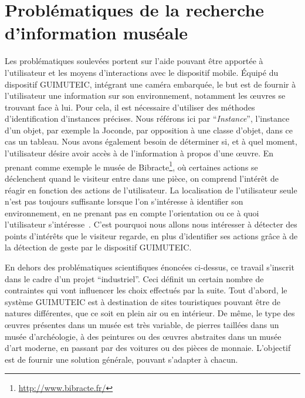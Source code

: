 \section{Problématiques de la recherche d'information muséale}
\label{sec:introcontraintes}
Les problématiques soulevées portent sur l'aide pouvant être apportée à l'utilisateur et les moyens d'interactions avec le dispositif mobile.
Équipé du dispositif GUIMUTEIC, intégrant une caméra embarquée, le but est de fournir à l'utilisateur une information sur son environnement, notamment les œuvres se trouvant face à lui.
Pour cela, il est nécessaire d'utiliser des méthodes d'identification d'instances précises.
Nous référons ici par ``{\it Instance}'', l'instance d'un objet, par exemple la Joconde, par opposition à une classe d'objet, dans ce cas un tableau.
Nous avons également besoin de déterminer si, et à quel moment, l'utilisateur désire avoir accès à de l'information à propos d’une œuvre.
En prenant comme exemple le musée de Bibracte\footnote{\url{http://www.bibracte.fr/}}, où certaines actions se déclenchent quand le visiteur entre dans une pièce, on comprend l'intérêt de réagir en fonction des actions de l'utilisateur.
La localisation de l’utilisateur seule n’est pas toujours suffisante lorsque l’on s’intéresse à identifier son environnement, en ne prenant pas en compte l’orientation ou ce à quoi l’utilisateur s’intéresse~\cite{schmidt1999there}.
C’est pourquoi nous allons nous intéresser à détecter des points d’intérêts que le visiteur regarde, en plus d’identifier ses actions grâce à de la détection de geste par le dispositif GUIMUTEIC.


En dehors des problématiques scientifiques énoncées ci-dessus, ce travail s'inscrit dans le cadre d'un projet ``industriel''.
Ceci définit un certain nombre de contraintes qui vont influencer les choix effectués par la suite.
Tout d'abord, le système GUIMUTEIC est à destination de sites touristiques pouvant être de natures différentes, que ce soit en plein air ou en intérieur.
De même, le type des œuvres présentes dans un musée est très variable, de pierres taillées dans un musée d'archéologie, à des peintures ou des œuvres abstraites dans un musée d'art moderne, en passant par des voitures ou des pièces de monnaie.
L'objectif est de fournir une solution générale, pouvant s'adapter à chacun.

